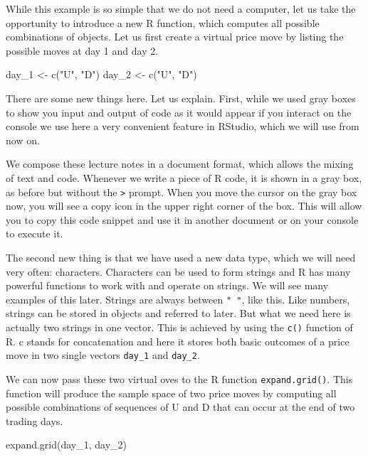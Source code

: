 \documentclass[
]{book}
\newenvironment{Shaded}{\begin{snugshade}}{\end{snugshade}}
\newcommand{\FunctionTok}[1]{\textcolor[rgb]{0.00,0.00,0.00}{#1}}
\newcommand{\NormalTok}[1]{#1}
\newcommand{\OtherTok}[1]{\textcolor[rgb]{0.56,0.35,0.01}{#1}}
\newcommand{\StringTok}[1]{\textcolor[rgb]{0.31,0.60,0.02}{#1}}
\begin{document}
While this example is so simple that we do not need a computer, let us take the opportunity to
introduce a new R function, which computes all possible combinations of objects.
Let us first create a virtual price move by listing the possible moves at day 1 and
day 2.

\begin{Shaded}
\begin{Highlighting}[]
\NormalTok{day\_1 }\OtherTok{\textless{}{-}} \FunctionTok{c}\NormalTok{(}\StringTok{"U"}\NormalTok{, }\StringTok{"D"}\NormalTok{)}
\NormalTok{day\_2 }\OtherTok{\textless{}{-}} \FunctionTok{c}\NormalTok{(}\StringTok{"U"}\NormalTok{, }\StringTok{"D"}\NormalTok{)}
\end{Highlighting}
\end{Shaded}

There are some new things here. Let us explain. First, while we used gray boxes to show you input
and output of code as it would appear if you interact on the console we use here a very convenient
feature in RStudio, which we will use from now on.

We compose these lecture notes in a document
format, which allows the mixing of text and code. Whenever we write a piece of R code, it is shown
in a gray box, as before but without the \texttt{\textgreater{}} prompt. When you move the cursor
on the gray box
now, you will see a copy icon in the upper right
corner of the box. This will allow you to copy this
code snippet and use it in another document or on your console to execute it.

The second new thing is that we have used a new data type, which we will
need very often: characters.
Characters can be used to form strings and R has many powerful functions to work with and operate
on strings. We will see many examples of this later.
Strings are always between \texttt{"\ "}, like this. Like
numbers, strings can be stored in objects and referred to later. But what we need here is actually
two strings in one vector. This is achieved by using the \texttt{c()} function of R.
c stands for concatenation
and here it stores both basic outcomes of a price move in two single vectors \texttt{day\_1} and \texttt{day\_2}.

We can now pass these two virtual oves to the R function \texttt{expand.grid()}.
This function will produce
the sample space of two price moves by computing all possible combinations of sequences of U and D
that can occur at the end of two trading days.

\begin{Shaded}
\begin{Highlighting}[]
\FunctionTok{expand.grid}\NormalTok{(day\_1, day\_2)}
\end{Highlighting}
\end{Shaded}
\end{document}
